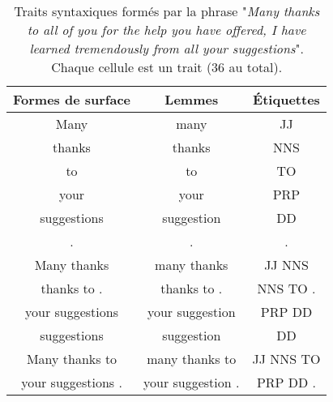 \begin{table}\small\centering
	\begin{tabular}{*{2}{c}c}
		\toprule
		\textbf{Formes de surface} & \textbf{Lemmes} & \textbf{Étiquettes}\\
		\midrule
		Many & many & JJ\\
		thanks & thanks & NNS\\
		to & to & TO\\
		your & your & PRP\\
		suggestions & suggestion & DD\\
		. & . & .\\
		Many thanks & many thanks & JJ NNS\\
		thanks to . & thanks to . & NNS TO . \\
		your suggestions & your suggestion & PRP DD\\
		suggestions & suggestion & DD\\
		Many thanks to & many thanks to & JJ NNS TO\\
		your suggestions . & your suggestion . & PRP DD .\\
		\bottomrule
	\end{tabular}
	\caption{Traits syntaxiques formés par la phrase "\textit{Many thanks to all of you for the help you have offered, I have learned tremendously from all your suggestions}". Chaque cellule est un trait (36 au total).}
	\label{fig:exampleSyntacticFeatures}
\end{table}